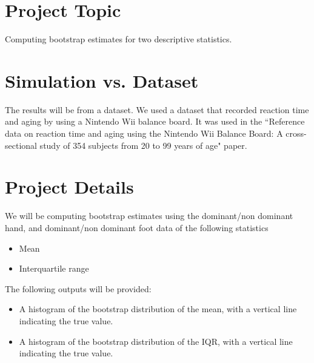 \documentclass{article}
\begin{document}
    \begin{normalsize}    
    	\section{Project Topic}
        Computing bootstrap estimates for two descriptive statistics. \\

        \section{Simulation vs. Dataset}
        The results will be from a dataset. We used a dataset that recorded reaction time and aging by using a Nintendo Wii balance board. It was used in the ``Reference data on reaction time and aging using the Nintendo Wii Balance Board: A cross-sectional study of 354 subjects from 20 to 99 years of age" paper.
        
        \section{Project Details}
        We will be computing bootstrap estimates using the dominant/non dominant hand, and dominant/non dominant foot data of the following statistics
        \begin{itemize}
            \item Mean
            \item Interquartile range
        \end{itemize}
        The following outputs will be provided:
        \begin{itemize}
            \item A histogram of the bootstrap distribution of the mean, with a vertical line indicating the true value.
            \item A histogram of the bootstrap distribution of the IQR, with a vertical line indicating the true value.
        \end{itemize}
        

\end{normalsize}
\end{document}
